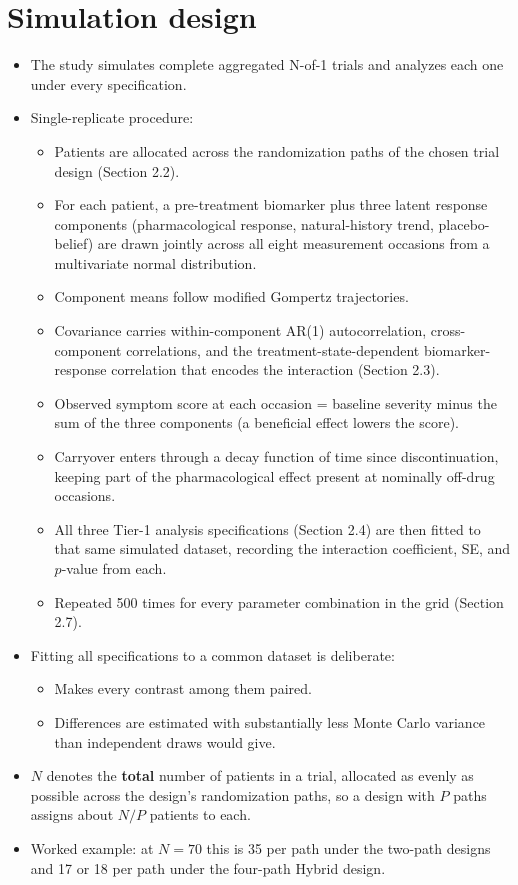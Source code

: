 \documentclass[
  11pt,
]{article}
\providecommand{\tightlist}{%
  \setlength{\itemsep}{0pt}\setlength{\parskip}{0pt}}
\begin{document}
\section{Simulation design}\label{simulation-design}

\begin{itemize}
\tightlist
\item
  The study simulates complete aggregated N-of-1 trials and analyzes
  each one under every specification.
\item
  Single-replicate procedure:

  \begin{itemize}
  \tightlist
  \item
    Patients are allocated across the randomization paths of the
    chosen trial design (Section 2.2).
  \item
    For each patient, a pre-treatment biomarker plus three latent
    response components (pharmacological response, natural-history
    trend, placebo-belief) are drawn jointly across all eight
    measurement occasions from a multivariate normal distribution.
  \item
    Component means follow modified Gompertz trajectories.
  \item
    Covariance carries within-component AR(1) autocorrelation,
    cross-component correlations, and the treatment-state-dependent
    biomarker-response correlation that encodes the interaction
    (Section 2.3).
  \item
    Observed symptom score at each occasion = baseline severity minus
    the sum of the three components (a beneficial effect lowers the
    score).
  \item
    Carryover enters through a decay function of time since
    discontinuation, keeping part of the pharmacological effect
    present at nominally off-drug occasions.
  \item
    All three Tier-1 analysis specifications (Section 2.4) are then
    fitted to that same simulated dataset, recording the interaction
    coefficient, SE, and \(p\)-value from each.
  \item
    Repeated 500 times for every parameter combination in the grid
    (Section 2.7).
  \end{itemize}
\item
  Fitting all specifications to a common dataset is deliberate:

  \begin{itemize}
  \tightlist
  \item
    Makes every contrast among them paired.
  \item
    Differences are estimated with substantially less Monte Carlo
    variance than independent draws would give.
  \end{itemize}
\item
  \(N\) denotes the \textbf{total} number of patients in a trial, allocated
  as evenly as possible across the design's randomization paths, so a
  design with \(P\) paths assigns about \(N/P\) patients to each.
\item
  Worked example: at \(N=70\) this is 35 per path under the two-path
  designs and 17 or 18 per path under the four-path Hybrid design.
\end{itemize}
\end{document}
